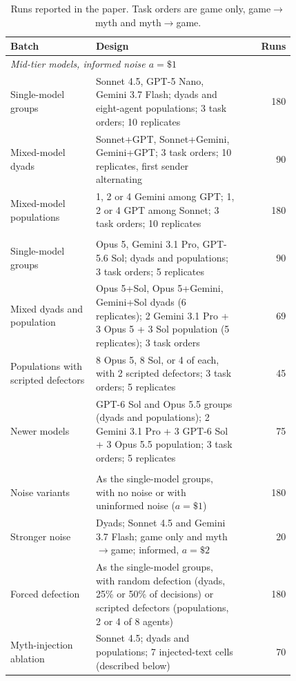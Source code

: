 \begin{table}[t]
\centering
\small
\caption{Runs reported in the paper. Task orders are game only, game$\rightarrow$myth and myth$\rightarrow$game.}
\label{tab:protocol-corpus}
\begin{tabular}{p{0.3\linewidth}p{0.52\linewidth}r}
\toprule
Batch & Design & Runs \\
\midrule
\multicolumn{3}{l}{\textit{Mid-tier models, informed noise $a=\$1$}} \\
Single-model groups & Sonnet 4.5, GPT-5 Nano, Gemini 3.7 Flash; dyads and eight-agent populations; 3 task orders; 10 replicates & 180 \\
Mixed-model dyads & Sonnet+GPT, Sonnet+Gemini, Gemini+GPT; 3 task orders; 10 replicates, first sender alternating & 90 \\
Mixed-model populations & 1, 2 or 4 Gemini among GPT; 1, 2 or 4 GPT among Sonnet; 3 task orders; 10 replicates & 180 \\
\addlinespace
\multicolumn{3}{l}{\textit{Frontier models, informed noise $a=\$1$}} \\
Single-model groups & Opus 5, Gemini 3.1 Pro, GPT-5.6 Sol; dyads and populations; 3 task orders; 5 replicates & 90 \\
Mixed dyads and population & Opus 5+Sol, Opus 5+Gemini, Gemini+Sol dyads (6 replicates); 2 Gemini 3.1 Pro + 3 Opus 5 + 3 Sol population (5 replicates); 3 task orders & 69 \\
Populations with scripted defectors & 8 Opus 5, 8 Sol, or 4 of each, with 2 scripted defectors; 3 task orders; 5 replicates & 45 \\
Newer models & GPT-6 Sol and Opus 5.5 groups (dyads and populations); 2 Gemini 3.1 Pro + 3 GPT-6 Sol + 3 Opus 5.5 population; 3 task orders; 5 replicates & 75 \\
\addlinespace
\multicolumn{3}{l}{\textit{Robustness, mid-tier models, 5 replicates}} \\
Noise variants & As the single-model groups, with no noise or with uninformed noise ($a=\$1$) & 180 \\
Stronger noise & Dyads; Sonnet 4.5 and Gemini 3.7 Flash; game only and myth$\rightarrow$game; informed, $a=\$2$ & 20 \\
Forced defection & As the single-model groups, with random defection (dyads, 25\% or 50\% of decisions) or scripted defectors (populations, 2 or 4 of 8 agents) & 180 \\
Myth-injection ablation & Sonnet 4.5; dyads and populations; 7 injected-text cells (described below) & 70 \\

\end{tabular}
\end{table}
